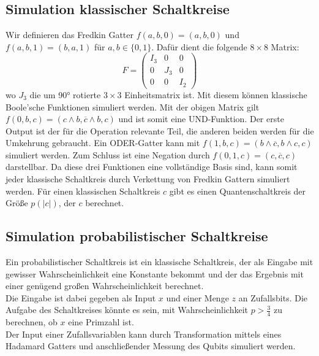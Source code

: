 \documentclass[a4paper, 12pt]{article}
\theoremstyle{plain}
\theoremstyle{definition}
\theoremstyle{lemma}
\theoremstyle{remark}
\theoremstyle{example}
\begin{document}
	\subsection{Simulation klassischer Schaltkreise}
	Wir definieren das Fredkin Gatter $f(a,b,0) = (a,b,0)$ und $f(a,b,1) = (b,a,1)$ für $a,b \in \{0,1\}$. Dafür dient die folgende $8\times8$ Matrix: \[F = \begin{pmatrix}
		I_3 & 0 & 0\\
		0 & J_3 & 0\\
		0 & 0 & I_2 
	\end{pmatrix}\] wo $J_3$ die um 90° rotierte $3\times3$ Einheitsmatrix ist. Mit diesem können klassische Boole'sche Funktionen simuliert werden. Mit der obigen Matrix gilt $f(0,b,c) = (c\land b, \overline{c}\land b, c)$ und ist somit eine UND-Funktion. Der erste Output ist der für die Operation relevante Teil, die anderen beiden werden für die Umkehrung gebraucht. Ein ODER-Gatter kann mit $f(1,b,c) = (b\land\overline{c}, b\land c, c)$ simuliert werden. Zum Schluss ist eine Negation durch $f(0,1,c) = (c,\overline{c},c)$ darstellbar. Da diese drei Funktionen eine vollständige Basis sind, kann somit jeder klassische Schaltkreis durch Verkettung von Fredkin Gattern simuliert werden. Für einen klassischen Schaltkreis $c$ gibt es einen Quantenschaltkreis der Größe $p(\left|c\right|)$, der $c$ berechnet. 
	\subsection{Simulation probabilistischer Schaltkreise}
	Ein probabilistischer Schaltkreis ist ein klassische Schaltkreis, der als Eingabe mit gewisser Wahrscheinlichkeit eine Konstante bekommt und der das Ergebnis mit einer genügend großen Wahrscheinlichkeit berechnet.\\
	Die Eingabe ist dabei gegeben als Input $x$ und einer Menge $z$ an Zufallsbits. Die Aufgabe des Schaltkreises könnte es sein, mit Wahrscheinlichkeit $p>\frac{3}{4}$ zu berechnen, ob $x$ eine Primzahl ist.\\
	Der Input einer Zufallsvariablen kann durch Transformation mittels eines Hadamard Gatters und anschließender Messung des Qubits simuliert werden.
\end{document}
